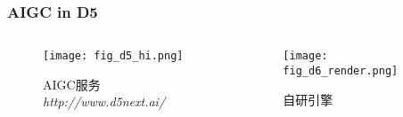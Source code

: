 \begin{frame}
    \frametitle{AIGC in D5}
    \begin{columns}[c]
        \begin{column}{0.5\textwidth} %
            \begin{figure}
                \texttt{[image: fig\_d5\_hi.png]}
                \caption[short]{AIGC服务\textit{http://www.d5next.ai/}}
            \end{figure}
        \end{column}
        \begin{column}{0.5\textwidth} %
            \begin{figure}
                \texttt{[image: fig\_d6\_render.png]}
                \caption[short]{自研引擎}
            \end{figure}
        \end{column}
    \end{columns}    
\end{frame}
    
